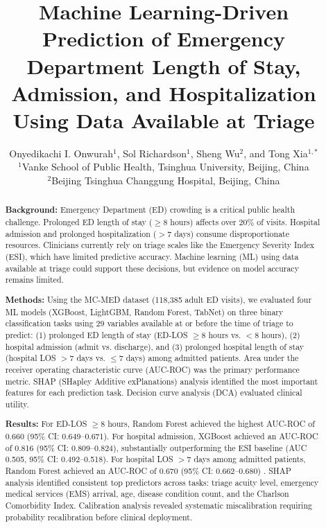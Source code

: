 \documentclass[harvard,article]{frontiersinFPHY_FAMS}
\title{Machine Learning-Driven Prediction of Emergency Department Length of Stay, Admission, and Hospitalization Using Data Available at Triage}
\author{Onyedikachi I. Onwurah$^{1}$, Sol Richardson$^{1}$, Sheng Wu$^{2}$, and Tong Xia$^{1,*}$ \\
\vspace{0.2cm}
\small{$^{1}$Vanke School of Public Health, Tsinghua University, Beijing, China}\\
\small{$^{2}$Beijing Tsinghua Changgung Hospital, Beijing, China} \\
}
\begin{document}
\maketitle

\begin{abstract}

\noindent\textbf{Background:} Emergency Department (ED) crowding is a critical public health challenge. Prolonged ED length of stay ($\geq$8 hours) affects over 20\% of visits. Hospital admission and prolonged hospitalization ($>$7 days) consume disproportionate resources. Clinicians currently rely on triage scales like the Emergency Severity Index (ESI), which have limited predictive accuracy. Machine learning (ML) using data available at triage could support these decisions, but evidence on model accuracy remains limited.

\noindent\textbf{Methods:} Using the MC-MED dataset (118,385 adult ED visits), we evaluated four ML models (XGBoost, LightGBM, Random Forest, TabNet) on three binary classification tasks using 29 variables available at or before the time of triage to predict: (1) prolonged ED length of stay (ED-LOS $\geq$8 hours vs. $<$8 hours), (2) hospital admission (admit vs. discharge), and (3) prolonged hospital length of stay (hospital LOS $>$7 days vs. $\leq$7 days) among admitted patients. Area under the receiver operating characteristic curve (AUC-ROC) was the primary performance metric. SHAP (SHapley Additive exPlanations) analysis identified the most important features for each prediction task. Decision curve analysis (DCA) evaluated clinical utility.

\noindent\textbf{Results:} For ED-LOS $\geq$8 hours, Random Forest achieved the highest AUC-ROC of 0.660 (95\% CI: 0.649--0.671). For hospital admission, XGBoost achieved an AUC-ROC of 0.816 (95\% CI: 0.809--0.824), substantially outperforming the ESI baseline (AUC 0.505, 95\% CI: 0.492--0.518). For hospital LOS $>$7 days among admitted patients, Random Forest achieved an AUC-ROC of 0.670 (95\% CI: 0.662--0.680) \cite{bacchi2022}. SHAP analysis identified consistent top predictors across tasks: triage acuity level, emergency medical services (EMS) arrival, age, disease condition count, and the Charlson Comorbidity Index. Calibration analysis revealed systematic miscalibration requiring probability recalibration before clinical deployment.


\end{abstract}
\end{document}

